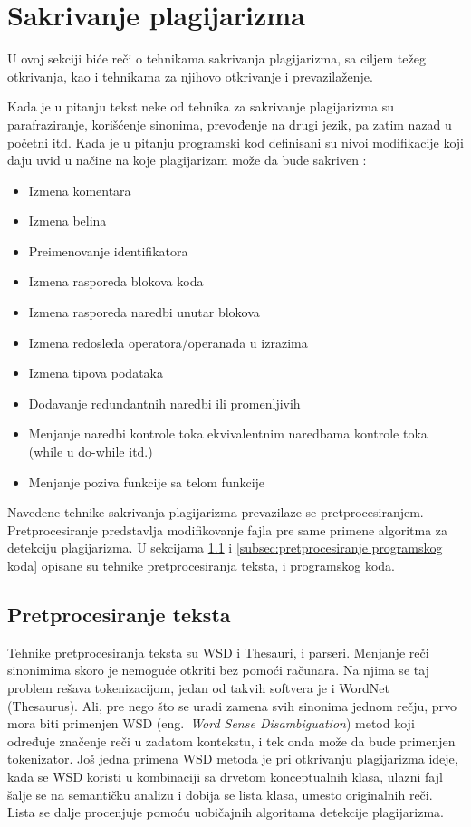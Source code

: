 \documentclass[a4paper]{article}
\begin{document}
\section{Sakrivanje plagijarizma}
\label{sec:sakrivanje plagijarizma}

U ovoj sekciji biće reči o tehnikama sakrivanja plagijarizma, sa ciljem težeg otkrivanja, kao i tehnikama za njihovo otkrivanje i prevazilaženje.
\par Kada je u pitanju tekst neke od tehnika za sakrivanje plagijarizma su parafraziranje, korišćenje sinonima, prevođenje na drugi jezik, pa zatim nazad u početni itd. Kada je u pitanju programski kod definisani su nivoi modifikacije koji daju uvid u načine na koje plagijarizam može da bude sakriven \cite{joyluck}:

\begin{itemize}
\item Izmena komentara
\item Izmena belina
\item Preimenovanje identifikatora
\item Izmena rasporeda blokova koda
\item Izmena rasporeda naredbi unutar blokova
\item Izmena redosleda operatora/operanada u izrazima
\item Izmena tipova podataka
\item Dodavanje redundantnih naredbi ili promenljivih
\item Menjanje naredbi kontrole toka ekvivalentnim naredbama kontrole toka (while u do-while itd.)
\item Menjanje poziva funkcije sa telom funkcije
\end{itemize}

Navedene tehnike sakrivanja plagijarizma prevazilaze se pretprocesiranjem. Pretprocesiranje predstavlja modifikovanje fajla pre same primene algoritma za detekciju plagijarizma. U sekcijama \ref{subsec:pretprocesiranje teksta} i \ref{subsec:pretprocesiranje programskog koda} opisane su tehnike pretprocesiranja teksta, i programskog koda.

\subsection{Pretprocesiranje teksta}
\label{subsec:pretprocesiranje teksta}

Tehnike pretprocesiranja teksta su WSD i Thesauri, i parseri. Menjanje reči sinonimima skoro je nemoguće otkriti bez pomoći računara. Na njima se taj problem rešava tokenizacijom, jedan od takvih softvera je i WordNet \cite{fellbaum} (Thesaurus). Ali, pre nego što se uradi zamena svih sinonima jednom rečju, prvo mora biti primenjen WSD (eng.~{\em Word Sense Disambiguation}) metod koji određuje značenje reči u zadatom kontekstu, i tek onda može da bude primenjen tokenizator. Još jedna primena WSD metoda je pri otkrivanju plagijarizma ideje, kada se WSD koristi u kombinaciji sa drvetom konceptualnih klasa, ulazni fajl šalje se na semantičku analizu i dobija se lista klasa, umesto originalnih reči. Lista se dalje procenjuje pomoću uobičajnih algoritama detekcije plagijarizma.
\end{document}
